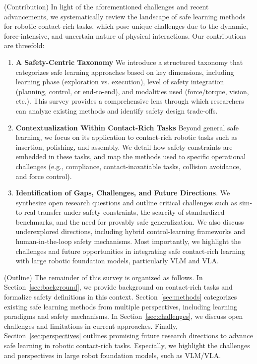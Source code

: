 \documentclass[Afour,sageh,times]{template/sagej}
\newcommand{\suggest}[1]{{\color{olive} (#1)}}
\begin{document}
\suggest{Contribution}
In light of the aforementioned challenges and recent advancements, we systematically review the landscape of safe learning methods for robotic contact-rich tasks, which pose unique challenges due to the dynamic, force-intensive, and uncertain nature of physical interactions. Our contributions are threefold:
\begin{enumerate}
    \item \textbf{A Safety-Centric Taxonomy} We introduce a structured taxonomy that categorizes safe learning approaches based on key dimensions, including learning phase (exploration vs. execution), level of safety integration (planning, control, or end-to-end), and modalities used (force/torque, vision, etc.). This survey provides a comprehensive lens through which researchers can analyze existing methods and identify safety design trade-offs.
    \item \textbf{Contextualization Within Contact-Rich Tasks} Beyond general safe learning, we focus on its application to contact-rich robotic tasks such as insertion, polishing, and assembly. We detail how safety constraints are embedded in these tasks, and map the methods used to specific operational challenges (e.g., compliance, contact-inavatiable tasks, collision avoidance, and force control).
    \item \textbf{Identification of Gaps, Challenges, and Future Directions}. We synthesize open research questions and outline critical challenges such as sim-to-real transfer under safety constraints, the scarcity of standardized benchmarks, and the need for provably safe generalization. We also discuss underexplored directions, including hybrid control-learning frameworks and human-in-the-loop safety mechanisms. Most importantly, we highlight the challenges and future opportunities in integrating safe contact-rich learning with large robotic foundation models, particularly VLM and VLA.
\end{enumerate}

\suggest{Outline}
The remainder of this survey is organized as follows. In Section~\ref{sec:background}, we provide background on contact-rich tasks and formalize safety definitions in this context. Section~\ref{sec:methods} categorizes existing safe learning methods from multiple perspectives, including learning paradigms and safety mechanisms. In Section~\ref{sec:challenges}, we discuss open challenges and limitations in current approaches. Finally, Section~\ref{sec:perspectives} outlines promising future research directions to advance safe learning in robotic contact-rich tasks. Especially, we highlight the challenges and perspectives in large robot foundation models, such as VLM/VLA.
\end{document}
